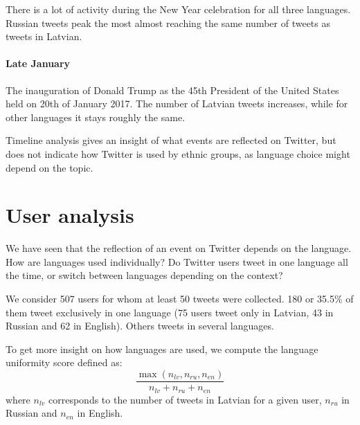 \documentclass[11pt,a4paper]{article}
\begin{document}
There is a lot of activity during the New Year celebration for all three languages. Russian tweets peak the most almost reaching the same number of tweets as tweets in Latvian.

\paragraph{Late January}



The inauguration of Donald Trump as the 45th President of the United States held on 20th of January 2017. The number of Latvian tweets increases, while for other languages it stays roughly the same.





Timeline analysis gives an insight of what events are reflected on Twitter, but does not indicate how Twitter is used by ethnic groups, as language choice might depend on the topic.

\section{User analysis}
\label{sec:lang-use}

We have seen that the reflection of an event on Twitter depends on the language. How are languages used individually? Do Twitter users tweet in one language all the time, or switch between languages depending on the context?

We consider 507 users for whom at least 50 tweets were collected. 180 or 35.5\% of them tweet exclusively in one language (75 users tweet only in Latvian, 43 in Russian and 62 in English). Others tweets in several languages.

To get more insight on how languages are used, we compute the language uniformity score defined as:
\begin{equation}
  \label{eq:score}
  \frac{\max(n_\mathit{lv}, n_\mathit{ru}, n_\mathit{en})}{n_\mathit{lv} + n_\mathit{ru} + n_\mathit{en}}
\end{equation}
where $n_\mathit{lv}$ corresponds to the number of tweets in Latvian for a given user, $n_\mathit{ru}$ in Russian and $n_\mathit{en}$ in English.
\end{document}

